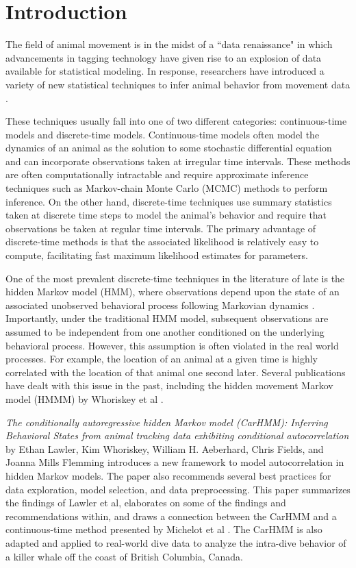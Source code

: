 
\section{Introduction}

The field of animal movement is in the midst of a ``data renaissance" in which advancements in tagging technology have given rise to an explosion of data available for statistical modeling. In response, researchers have introduced a variety of new statistical techniques to infer animal behavior from movement data \cite{Hooten:2017}. 

These techniques usually fall into one of two different categories: continuous-time models and discrete-time models. Continuous-time models often model the dynamics of an animal as the solution to some stochastic differential equation and can incorporate observations taken at irregular time intervals. These methods are often computationally intractable and require approximate inference techniques such as Markov-chain Monte Carlo (MCMC) methods to perform inference. On the other hand, discrete-time techniques use summary statistics taken at discrete time steps to model the animal's behavior and require that observations be taken at regular time intervals. The primary advantage of discrete-time methods is that the associated likelihood is relatively easy to compute, facilitating fast maximum likelihood estimates for parameters. 

One of the most prevalent discrete-time techniques in the literature of late is the hidden Markov model (HMM), where observations depend upon the state of an associated unobserved behavioral process following Markovian dynamics \cite{Patterson:2017}. Importantly, under the traditional HMM model, subsequent observations are assumed to be independent from one another conditioned on the underlying behavioral process. However, this assumption is often violated in the real world processes. For example, the location of an animal at a given time is highly correlated with the location of that animal one second later. Several publications have dealt with this issue in the past, including the hidden movement Markov model (HMMM) by Whoriskey et al \cite{Whoriskey:2016}. 

\textit{The conditionally autoregressive hidden Markov model (CarHMM): Inferring Behavioral States from animal tracking data exhibiting conditional autocorrelation} by Ethan Lawler, Kim Whoriskey, William H. Aeberhard, Chris Fields, and Joanna Mills Flemming introduces a new framework to model autocorrelation in hidden Markov models. The paper also recommends several best practices for data exploration, model selection, and data preprocessing. This paper summarizes the findings of Lawler et al, elaborates on some of the findings and recommendations within, and draws a connection between the CarHMM and a continuous-time method presented by Michelot et al \cite{Michelot:2019}. The CarHMM is also adapted and applied to real-world dive data to analyze the intra-dive behavior of a killer whale off the coast of British Columbia, Canada.